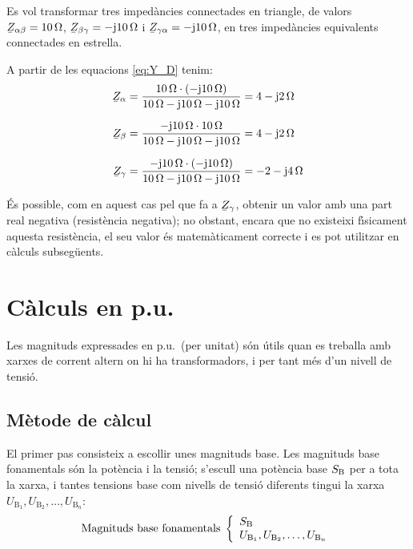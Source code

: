 \begin{exemple}
Es vol transformar tres imped\`{a}ncies connectades en triangle, de
valors $ \cmplx{Z}_{\alpha\beta}=10\unit{\ohm}$,
$\cmplx{Z}_{\beta\gamma}=-\ju10\unit{\ohm}$ i
$\cmplx{Z}_{\gamma\alpha}=-\ju10\unit{\ohm}$, en tres imped\`{a}ncies
equivalents connectades en estrella.

A partir de les equacions \eqref{eq:Y_D}  tenim:
\begin{align*}
   \cmplx{Z}_{\alpha} & = \frac{10\unit{\ohm}\cdot(-\ju10\unit{\ohm})}{10\unit{\ohm} - \ju10\unit{\ohm} - \ju10\unit{\ohm}} = 4 - \ju 2\unit{\ohm} \\[1.5ex]
   \cmplx{Z}_{\beta} & = \frac{-\ju10\unit{\ohm}\cdot10\unit{\ohm}}{10\unit{\ohm} - \ju10\unit{\ohm} - \ju10\unit{\ohm}} = 4 - \ju 2\unit{\ohm} \\[1.5ex]
\cmplx{Z}_{\gamma} &=
\frac{-\ju10\unit{\ohm}\cdot(-\ju10\unit{\ohm})}{10\unit{\ohm} -
\ju10\unit{\ohm} - \ju10\unit{\ohm}} = -2 - \ju 4\unit{\ohm}
\end{align*}

\'{E}s possible, com en aquest cas pel que fa a $\cmplx{Z}_{\gamma}$,
obtenir un valor amb una part real negativa (resist\`{e}ncia negativa);
no obstant, encara que no existeixi f\'{\i}sicament aquesta resist\`{e}ncia,
el seu valor \'{e}s matem\`{a}ticament correcte i es pot utilitzar en
c\`{a}lculs subseg\"{u}ents.
\end{exemple}


\section{C\`{a}lculs en p.u.} \label{sec:seccio_pu} 

Les magnituds expressades en p.u.\ (per unitat) s\'{o}n \'{u}tils quan es treballa
amb xarxes de corrent altern on hi ha transformadors, i per tant m\'{e}s d'un nivell de tensi\'{o}.

\subsection{M\`{e}tode de c\`{a}lcul} 

 El primer pas consisteix a
escollir unes magnituds base. Les magnituds base fonamentals s\'{o}n la
pot\`{e}ncia i la tensi\'{o}; s'escull una pot\`{e}ncia base $S_\mathrm{B}$ per a
tota la xarxa, i tantes tensions base com nivells de tensi\'{o}
diferents tingui la xarxa $U_{\text{B}_1}, U_{\text{B}_2}, \ldots,
U_{\text{B}_n}$:
\begin{equation}
   \text{Magnituds base fonamentals}\;\left\{
\begin{array}{l}
   S_\mathrm{B} \\
   U_{\text{B}_1}, U_{\text{B}_2}, \ldots, U_{\text{B}_n}
\end{array}
\right.
\end{equation}

